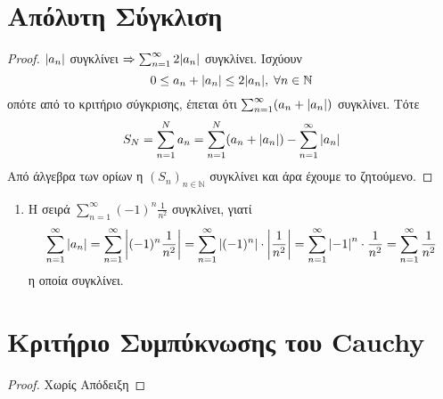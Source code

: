 \section{Απόλυτη Σύγκλιση}


\begin{proof}
    $ \abs{a_{n}} $ συγκλίνει $ \Rightarrow \sum_{n=1}^{\infty} 2 \abs{a_{n}} $ 
    συγκλίνει. Ισχύουν
    \[
        0 \leq a_{n} + \abs{a_{n}} \leq 2 \abs{a_{n}}, \; \forall n \in \mathbb{N} 
    \] 
    οπότε από το κριτήριο σύγκρισης, έπεται ότι $ \sum_{n=1}^{\infty} (a_{n}+ 
    \abs{a_{n}}) $ συγκλίνει. Τότε
    \[
        S_{N} = \sum_{n=1}^{N} a_{n} = \sum_{n=1}^{N} (a_{n}+ \abs{a_{n}}) - 
        \sum_{n=1}^{\infty} \abs{a_{n}}   
    \] 
    Από άλγεβρα των ορίων η $ {(S_{n})}_{n \in \mathbb{N}} $ συγκλίνει και άρα 
    έχουμε το ζητούμενο.
\end{proof}

\begin{examples}
\item {}
    \begin{enumerate}
        \item Η σειρά $ \sum_{n=1}^{\infty} (-1)^{n} \frac{1}{n^{2}} $ συγκλίνει, 
            γιατί 
            \[ 
                \sum_{n=1}^{\infty} \abs{a_{n}} = \sum_{n=1}^{\infty} \abs{(-1)^{n}
                \frac{1}{n^{2}}} = \sum_{n=1}^{\infty} \abs{(-1)^{n}} 
                \cdot \abs{\frac{1}{n^{2}} } =  
                \sum_{n=1}^{\infty} \abs{-1}^{n} \cdot 
                \frac{1}{n^{2}} = \sum_{n=1}^{\infty} \frac{1}{n^{2}} 
            \]
            η οποία συγκλίνει.
    \end{enumerate}
\end{examples}

\section{Κριτήριο Συμπύκνωσης του Cauchy}


\begin{proof}
    Χωρίς Απόδειξη
\end{proof}

